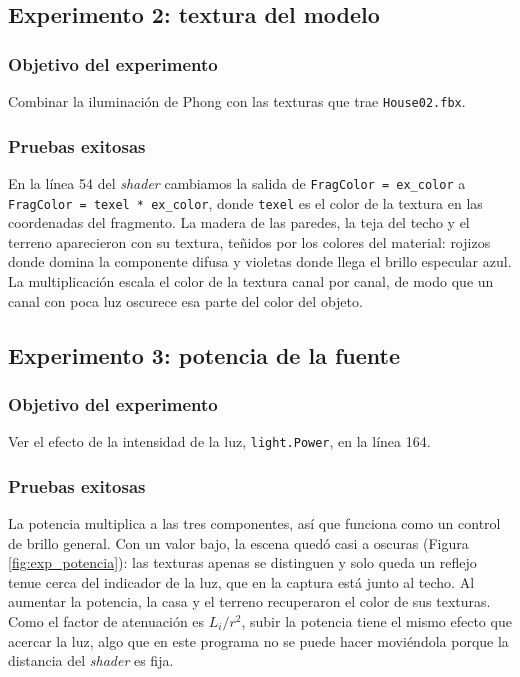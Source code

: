 \subsection{Experimento 2: textura del modelo}

\subsubsection{Objetivo del experimento}
Combinar la iluminación de Phong con las texturas que trae \texttt{House02.fbx}.

\subsubsection{Pruebas exitosas}
En la línea 54 del \textit{shader} cambiamos la salida de \texttt{FragColor = ex\_color} a \texttt{FragColor = texel * ex\_color}, donde \texttt{texel} es el color de la textura en las coordenadas del fragmento. La madera de las paredes, la teja del techo y el terreno aparecieron con su textura, teñidos por los colores del material: rojizos donde domina la componente difusa y violetas donde llega el brillo especular azul. La multiplicación escala el color de la textura canal por canal, de modo que un canal con poca luz oscurece esa parte del color del objeto.

\subsection{Experimento 3: potencia de la fuente}

\subsubsection{Objetivo del experimento}
Ver el efecto de la intensidad de la luz, \texttt{light.Power}, en la línea 164.

\subsubsection{Pruebas exitosas}
La potencia multiplica a las tres componentes, así que funciona como un control de brillo general. Con un valor bajo, la escena quedó casi a oscuras (Figura \ref{fig:exp_potencia}): las texturas apenas se distinguen y solo queda un reflejo tenue cerca del indicador de la luz, que en la captura está junto al techo. Al aumentar la potencia, la casa y el terreno recuperaron el color de sus texturas. Como el factor de atenuación es $L_i / r^2$, subir la potencia tiene el mismo efecto que acercar la luz, algo que en este programa no se puede hacer moviéndola porque la distancia del \textit{shader} es fija.

